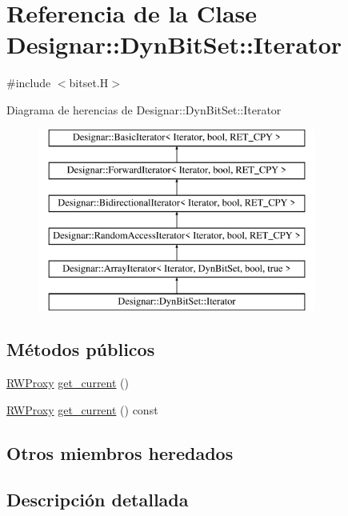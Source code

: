 \hypertarget{class_designar_1_1_dyn_bit_set_1_1_iterator}{}\section{Referencia de la Clase Designar\+:\+:Dyn\+Bit\+Set\+:\+:Iterator}
\label{class_designar_1_1_dyn_bit_set_1_1_iterator}


{\ttfamily \#include $<$bitset.\+H$>$}

Diagrama de herencias de Designar\+:\+:Dyn\+Bit\+Set\+:\+:Iterator\begin{figure}[H]
\begin{center}
\leavevmode
\includegraphics[height=6.000000cm]{class_designar_1_1_dyn_bit_set_1_1_iterator}
\end{center}
\end{figure}
\subsection*{Métodos públicos}
\begin{DoxyCompactItemize}
\item 
\hyperlink{class_designar_1_1_dyn_bit_set_1_1_r_w_proxy}{R\+W\+Proxy} \hyperlink{class_designar_1_1_dyn_bit_set_1_1_iterator_a413eba67b23a9400666c18845bbe795a}{get\+\_\+current} ()
\item 
\hyperlink{class_designar_1_1_dyn_bit_set_1_1_r_w_proxy}{R\+W\+Proxy} \hyperlink{class_designar_1_1_dyn_bit_set_1_1_iterator_a034af8ec4f70d792837cab4923799e9f}{get\+\_\+current} () const
\end{DoxyCompactItemize}
\subsection*{Otros miembros heredados}


\subsection{Descripción detallada}


